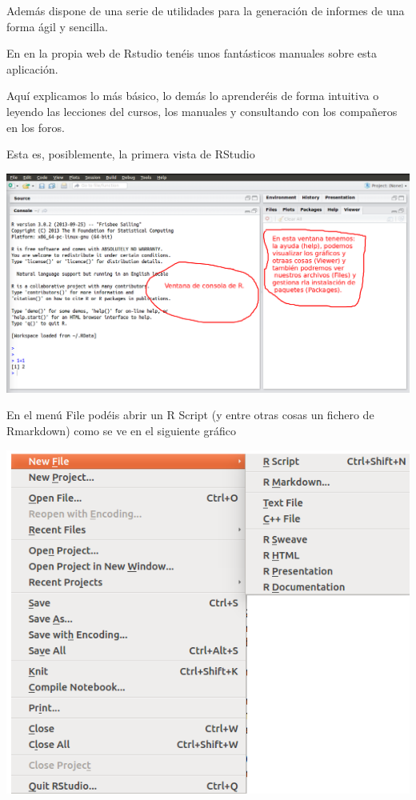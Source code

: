 \documentclass[]{article}
\begin{document}
Además dispone de una serie de utilidades para la generación de informes
de una forma ágil y sencilla.

En en la propia web de Rstudio tenéis unos fantásticos manuales sobre
esta aplicación.

Aquí explicamos lo más básico, lo demás lo aprenderéis de forma
intuitiva o leyendo las lecciones del cursos, los manuales y consultando
con los compañeros en los foros.

Esta es, posiblemente, la primera vista de RStudio

\includegraphics{figures/RStudioInicio1.png}

En el menú File podéis abrir un R Script (y entre otras cosas un fichero
de Rmarkdown) como se ve en el siguiente gráfico

\includegraphics{figures/Menu_Inicio1.png}
\end{document}
